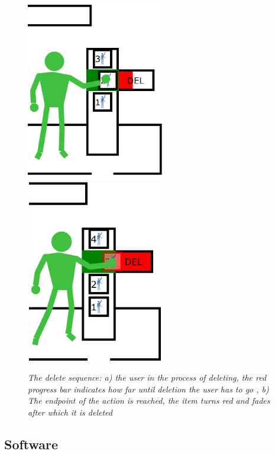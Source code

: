 \begin{figure}[H]
	\begin{center}
		\includegraphics[width=6cm, height=8cm]{figures/12_delete_progress.png}
		\includegraphics[width=6cm, height=8cm]{figures/13_delete_complete.png}
		\caption{\emph{The delete sequence: a) the user in the process of deleting, the red progress bar indicates how far until deletion the user has to go , b) The endpoint of the action is reached, the item turns red and fades after which it is deleted}}
		\label{The regular view of the end desing of the UI}
	\end{center}
\end{figure}




\subsection{Software}

